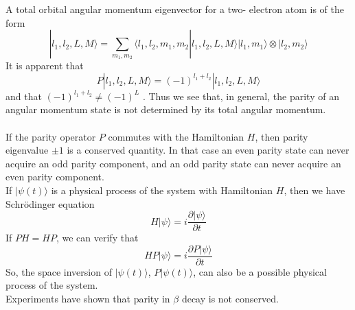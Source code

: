 A total orbital angular momentum eigenvector for a two-
electron atom is of the form
\[|l_1,l_2,L,M\rangle = \sum_{m_1,m_2}  \langle l_1,l_2,m_1,m_2 | l_1,l_2,L,M\rangle |l_1,m_1\rangle \otimes |l_2,m_2\rangle\]
It is apparent that
\[P|l_1,l_2,L,M\rangle = (-1)^{l_1+l_2}|l_1,l_2,L,M\rangle\]
and that $(-1)^{l_1+l_2} \neq (-1)^{L}$ . Thus we see that, in general, the parity of an angular momentum state is not determined by its total angular momentum.\\ \\
If the parity operator $P$ commutes with the Hamiltonian $H$, then parity eigenvalue $\pm 1$ is a conserved quantity. In that case an even parity state can never acquire an odd parity component, and an odd parity state can never acquire an even parity component. \\
If $|\psi(t)\rangle$ is a physical process of the system with Hamiltonian $H$, then we have Schrödinger equation 
\[H|\psi\rangle = i\frac{\partial |\psi\rangle }{\partial t}\]
If $PH = HP$, we can verify that
\[H P|\psi\rangle = i\frac{\partial P |\psi\rangle }{\partial t}\]
So, the space inversion of $|\psi(t)\rangle$, $P|\psi(t)\rangle$, can also be a possible physical process of the system.\\
Experiments have shown that parity in $\beta$ decay is not conserved.

